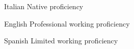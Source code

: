 

\begin{cvskills}

\cvskill
{Italian} %
{Native proficiency} %

\cvskill
{English} %
{Professional working proficiency} %

\cvskill
{Spanish} %
{Limited working proficiency} %

\end{cvskills}
